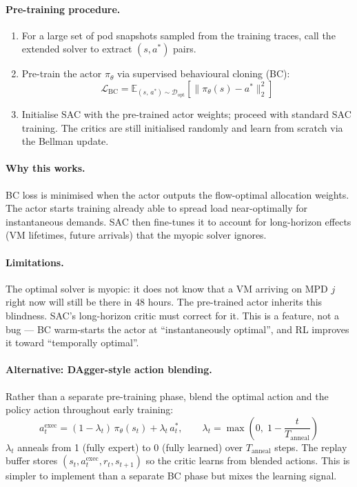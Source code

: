 \documentclass[11pt]{article}
\begin{document}
\paragraph{Pre-training procedure.}
\begin{enumerate}
  \item For a large set of pod snapshots sampled from the training traces,
        call the extended solver to extract $(s, a^*)$ pairs.
  \item Pre-train the actor $\pi_\theta$ via supervised behavioural cloning (BC):
        \begin{equation}
          \mathcal{L}_{\text{BC}}
          = \mathbb{E}_{(s,\,a^*) \sim \mathcal{D}_{\text{opt}}}
            \!\left[
              \bigl\|\pi_\theta(s) - a^*\bigr\|_2^2
            \right]
          \label{eq:bc_loss}
        \end{equation}
  \item Initialise SAC with the pre-trained actor weights; proceed with
        standard SAC training.  The critics are still initialised randomly
        and learn from scratch via the Bellman update.
\end{enumerate}

\paragraph{Why this works.}
BC loss is minimised when the actor outputs the flow-optimal allocation weights.
The actor starts training already able to spread load near-optimally for
instantaneous demands.  SAC then fine-tunes it to account for long-horizon
effects (VM lifetimes, future arrivals) that the myopic solver ignores.

\paragraph{Limitations.}
The optimal solver is myopic: it does not know that a VM arriving on MPD $j$
right now will still be there in 48 hours.  The pre-trained actor inherits this
blindness.  SAC's long-horizon critic must correct for it.  This is a feature,
not a bug --- BC warm-starts the actor at ``instantaneously optimal'', and RL
improves it toward ``temporally optimal''.

\paragraph{Alternative: DAgger-style action blending.}
Rather than a separate pre-training phase, blend the optimal action and the
policy action throughout early training:
\begin{equation}
  a_t^{\text{exec}} = (1 - \lambda_t)\,\pi_\theta(s_t) + \lambda_t\,a_t^*,
  \qquad
  \lambda_t = \max\!\left(0,\; 1 - \frac{t}{T_{\text{anneal}}}\right)
  \label{eq:dagger_blend}
\end{equation}
$\lambda_t$ anneals from 1 (fully expert) to 0 (fully learned) over
$T_{\text{anneal}}$ steps.  The replay buffer stores $(s_t, a_t^{\text{exec}},
r_t, s_{t+1})$ so the critic learns from blended actions.  This is simpler to
implement than a separate BC phase but mixes the learning signal.
\end{document}
